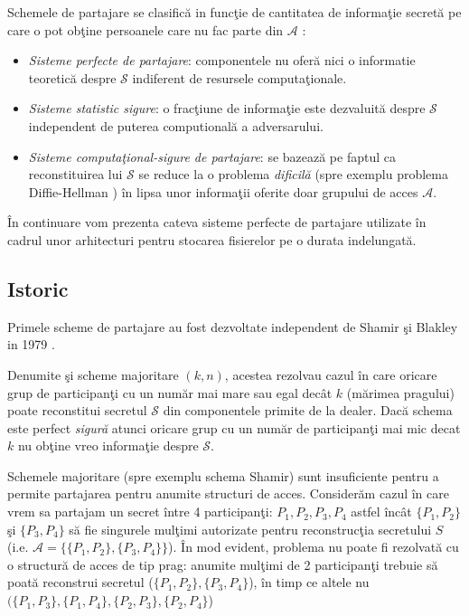 \documentclass{llncs}
\newcommand{\todo}[1]{{\color{red}{TODO #1}}}
\begin{document}
Schemele de partajare se clasific\u{a} in func\c{t}ie de cantitatea de informa\c{t}ie secret\u{a} pe care o pot ob\c{t}ine persoanele care nu fac parte din $\mathcal{A}$ \cite{Martin:2008}:
\begin{itemize}
	\item \textit{Sisteme perfecte de partajare}: componentele nu ofer\u{a} nici o informatie teoretic\u{a} despre $\mathcal{S}$ indiferent de resursele computa\c{t}ionale.
	\item \textit{Sisteme statistic sigure}: o frac\c{t}iune de informa\c{t}ie este dezvaluit\u{a} despre $\mathcal{S}$ independent de puterea computional\u{a} a adversarului.
	\item \textit{Sisteme computa\c{t}ional-sigure de partajare}: se bazeaz\u{a} pe faptul ca reconstituirea lui $\mathcal{S}$ se reduce la o problema \textit{dificil\u{a}} (spre exemplu problema Diffie-Hellman \cite{boneh:1998decision} ) \^{i}n lipsa unor informa\c{t}ii oferite doar grupului de acces $\mathcal{A}$.
\end{itemize} 

\^{I}n continuare vom prezenta cateva sisteme perfecte de partajare utilizate \^{i}n cadrul unor arhitecturi pentru stocarea fisierelor pe o durata indelungat\u{a}.

\subsection{Istoric}

Primele scheme de partajare au fost dezvoltate independent de Shamir \c{s}i Blakley in 1979 \cite{B:1979, S:1979}.

Denumite \c{s}i scheme majoritare $(k, n)$, acestea rezolvau cazul \^{i}n care oricare grup de participan\c{t}i cu un num\u{a}r mai mare sau egal dec\^{a}t $k$  (m\u{a}rimea pragului) poate reconstitui secretul $\mathcal{S}$ din componentele primite de la dealer. Dac\u{a} schema este perfect \textit{sigur\u{a}} atunci oricare grup cu un num\u{a}r de participan\c{t}i mai mic decat $k$ nu ob\c{t}ine vreo informa\c{t}ie despre $\mathcal{S}$.


Schemele majoritare (spre exemplu schema Shamir) sunt insuficiente pentru a permite partajarea pentru anumite structuri de acces. Consider\u{a}m cazul \^{i}n care vrem sa partajam un secret \^{i}ntre 4 participan\c{t}i: $P_1, P_2, P_3, P_4$ astfel \^{i}nc\^{a}t $\{P_1,P_2\}$ \c{s}i $\{P_3,P_4\}$ s\u{a} fie singurele mul\c{t}imi autorizate pentru reconstruc\c{t}ia secretului $S$ (i.e. $\mathcal{A} = \{ \{P_1,P_2\}, \{P_3,P_4\} \}$). \^{I}n mod evident, problema nu poate fi rezolvat\u{a} cu o structur\u{a} de acces de tip prag: anumite mul\c{t}imi de 2 participan\c{t}i trebuie s\u{a} poat\u{a} reconstrui secretul ($ \{P_1,P_2\}, \{P_3,P_4\} $), \^{i}n timp ce altele nu $( \{P_1,P_3\}, \{P_1,P_4\}, \{P_2,P_3\}, \{P_2,P_4\} $)
\end{document}
